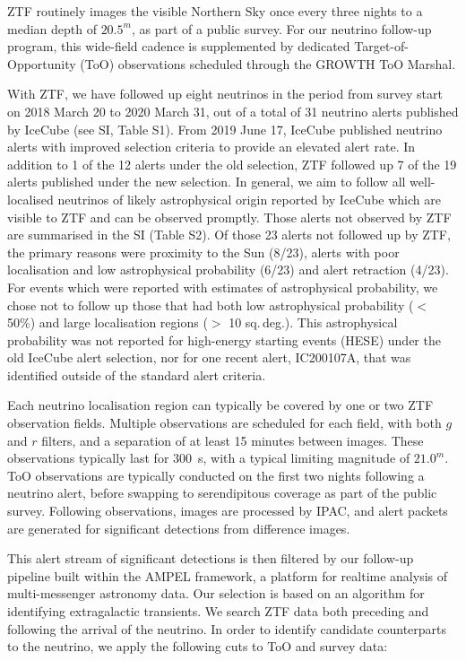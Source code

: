  ZTF routinely images the visible Northern Sky once every three nights to a median depth of $20.5^{m}$, as part of a public survey\cite{2019PASP..131a8002B, 2019PASP..131g8001G}. For our neutrino follow-up program, this wide-field cadence is supplemented by dedicated Target-of-Opportunity (ToO) observations scheduled through the GROWTH ToO Marshal\cite{2019PASP..131d8001C}. 

With ZTF, we have followed up eight neutrinos in the period from survey start on 2018 March 20 to 2020 March 31, out of a total of 31 neutrino alerts published by IceCube (see SI, Table S1). From 2019 June 17, IceCube published neutrino alerts with improved selection criteria to provide an elevated alert rate\cite{2019ICRC...36.1021B}. In addition to 1 of the 12 alerts under the old selection, ZTF  followed up 7 of the 19 alerts published under the new selection. In general, we aim to follow all well-localised neutrinos of likely astrophysical origin reported by IceCube which are visible to ZTF and can be observed promptly. Those alerts not observed by ZTF are summarised in the SI (Table S2). Of those 23 alerts not followed up by ZTF, the primary reasons were proximity to the Sun (8/23), alerts with poor localisation and low astrophysical probability (6/23) and alert retraction (4/23). For events which were reported with estimates of astrophysical probability, we chose not to follow up those that had both low astrophysical probability ($<$ 50\%) and large localisation regions ($>$ 10 sq.\,deg.). This astrophysical probability was not reported for high-energy starting events (HESE) under the old IceCube alert selection, nor for one recent alert, IC200107A, that was identified outside of the standard alert criteria\cite{stein:gcn26655}.

Each neutrino localisation region can typically be covered by one or two ZTF observation fields. Multiple observations are scheduled for each field, with both $g$ and $r$ filters, and a separation of at least 15 minutes between images. These observations typically last for 300~s, with a typical limiting magnitude of $21.0^{m}$.  ToO observations are typically conducted on the first two nights following a neutrino alert, before swapping to serendipitous coverage as part of the public survey. Following observations, images are processed by IPAC\cite{2019PASP..131a8003M}, and alert packets are generated for significant detections from difference images\cite{2019PASP..131a8001P}.

This alert stream of significant detections is then filtered by our follow-up pipeline built within the AMPEL framework\cite{ampel_followup_pipeline}, a platform for realtime analysis of multi-messenger astronomy data\cite{2019A&A...631A.147N}. Our selection is based on an algorithm for identifying extragalactic transients\cite{2019A&A...631A.147N}. We search ZTF data both preceding and following the arrival of the neutrino. In order to identify candidate counterparts to the neutrino, we apply the following cuts to ToO and survey data:

